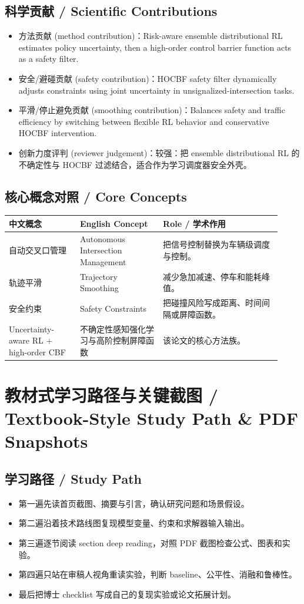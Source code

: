 \documentclass[UTF8,a4paper,11pt,fontset=fandol]{ctexart}
\begin{document}
\subsection{科学贡献 / Scientific Contributions}
\begin{itemize}
\item 方法贡献 (method contribution)：Risk-aware ensemble distributional RL estimates policy uncertainty, then a high-order control barrier function acts as a safety filter.
\item 安全/避碰贡献 (safety contribution)：HOCBF safety filter dynamically adjusts constraints using joint uncertainty in unsignalized-intersection tasks.
\item 平滑/停止避免贡献 (smoothing contribution)：Balances safety and traffic efficiency by switching between flexible RL behavior and conservative HOCBF intervention.
\item 创新力度评判 (reviewer judgement)：较强：把 ensemble distributional RL 的不确定性与 HOCBF 过滤结合，适合作为学习调度器安全外壳。
\end{itemize}


\subsection{核心概念对照 / Core Concepts}
\begin{longtable}{p{0.24\linewidth}p{0.28\linewidth}p{0.40\linewidth}}
\toprule
中文概念 & English Concept & Role / 学术作用\\
\midrule
自动交叉口管理 & Autonomous Intersection Management & 把信号控制替换为车辆级调度与控制。 \\
轨迹平滑 & Trajectory Smoothing & 减少急加减速、停车和能耗峰值。 \\
安全约束 & Safety Constraints & 把碰撞风险写成距离、时间间隔或屏障函数。 \\
Uncertainty-aware RL + high-order CBF & 不确定性感知强化学习与高阶控制屏障函数 & 该论文的核心方法族。 \\
\bottomrule
\end{longtable}

\section{教材式学习路径与关键截图 / Textbook-Style Study Path \& PDF Snapshots}
\subsection{学习路径 / Study Path}
\begin{itemize}
\item 第一遍先读首页截图、摘要与引言，确认研究问题和场景假设。
\item 第二遍沿着技术路线图复现模型变量、约束和求解器输入输出。
\item 第三遍逐节阅读 section deep reading，对照 PDF 截图检查公式、图表和实验。
\item 第四遍只站在审稿人视角重读实验，判断 baseline、公平性、消融和鲁棒性。
\item 最后把博士 checklist 写成自己的复现实验或论文拓展计划。
\end{itemize}
\end{document}
